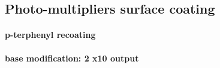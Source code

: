 \subsection{Photo-multipliers surface coating}

\paragraph{p-terphenyl recoating}
\paragraph{base modification: 2 x10 output}

